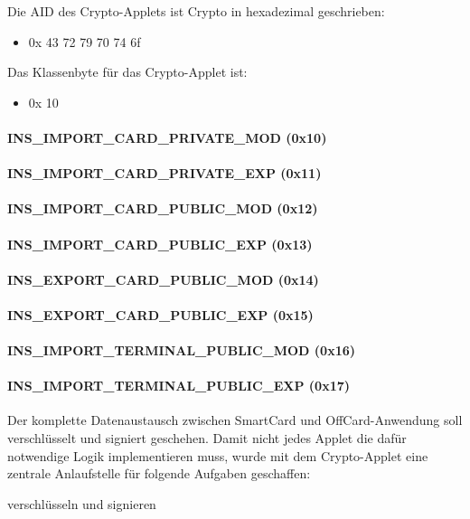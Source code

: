 Die AID des Crypto-Applets ist Crypto in hexadezimal geschrieben:
\begin{itemize}
	\item 0x 43 72 79 70 74 6f
\end{itemize}
Das Klassenbyte für das Crypto-Applet ist:
\begin{itemize}
	\item 0x 10
\end{itemize}

\paragraph{INS\_IMPORT\_CARD\_PRIVATE\_MOD (0x10)}
\paragraph{INS\_IMPORT\_CARD\_PRIVATE\_EXP (0x11)}
\paragraph{INS\_IMPORT\_CARD\_PUBLIC\_MOD (0x12)}
\paragraph{INS\_IMPORT\_CARD\_PUBLIC\_EXP (0x13)}
\paragraph{INS\_EXPORT\_CARD\_PUBLIC\_MOD (0x14)}
\paragraph{INS\_EXPORT\_CARD\_PUBLIC\_EXP (0x15)}
\paragraph{INS\_IMPORT\_TERMINAL\_PUBLIC\_MOD (0x16)}
\paragraph{INS\_IMPORT\_TERMINAL\_PUBLIC\_EXP (0x17)}


Der komplette Datenaustausch zwischen SmartCard und OffCard-Anwendung soll verschlüsselt und signiert geschehen. 
Damit nicht jedes Applet die dafür notwendige Logik implementieren muss, wurde mit dem Crypto-Applet eine zentrale Anlaufstelle für folgende Aufgaben geschaffen:

verschlüsseln und signieren

